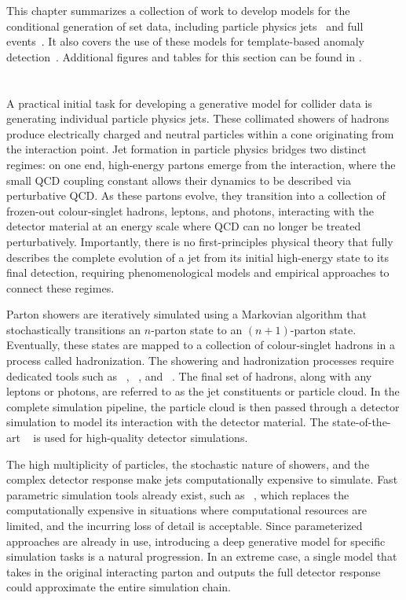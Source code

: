 This chapter summarizes a collection of work to develop models for the conditional generation of set data, including particle physics jets~\cite{PCJedi, EpicJedi, PCDroid} and full events~\cite{PIPPIN}.
It also covers the use of these models for template-based anomaly detection~\cite{Drapes, RadOT}.
Additional figures and tables for this section can be found in .

\section{\pcjedi}

A practical initial task for developing a generative model for collider data is generating individual particle physics jets.
These collimated showers of hadrons produce electrically charged and neutral particles within a cone originating from the interaction point.
Jet formation in particle physics bridges two distinct regimes: on one end, high-energy partons emerge from the interaction, where the small QCD coupling constant allows their dynamics to be described via perturbative QCD.
As these partons evolve, they transition into a collection of frozen-out colour-singlet hadrons, leptons, and photons, interacting with the detector material at an energy scale where QCD can no longer be treated perturbatively.
Importantly, there is no first-principles physical theory that fully describes the complete evolution of a jet from its initial high-energy state to its final detection, requiring phenomenological models and empirical approaches to connect these regimes.

Parton showers are iteratively simulated using a Markovian algorithm that stochastically transitions an $n$-parton state to an $(n+1)$-parton state.
Eventually, these states are mapped to a collection of colour-singlet hadrons in a process called hadronization.
The showering and hadronization processes require dedicated tools such as \pythia~\cite{Pythia8}, \sherpa~\cite{Sherpa}, and \herwig~\cite{Herwig}.
The final set of hadrons, along with any leptons or photons, are referred to as the jet constituents or particle cloud.
In the complete simulation pipeline, the particle cloud is then passed through a detector simulation to model its interaction with the detector material.
The state-of-the-art \geant~\cite{Geant4} is used for high-quality detector simulations.

The high multiplicity of particles, the stochastic nature of showers, and the complex detector response make jets computationally expensive to simulate.
Fast parametric simulation tools already exist, such as \delphes~\cite{Delphes}, which replaces the computationally expensive \geant in situations where computational resources are limited, and the incurring loss of detail is acceptable.
Since parameterized approaches are already in use, introducing a deep generative model for specific simulation tasks is a natural progression.
In an extreme case, a single model that takes in the original interacting parton and outputs the full detector response could approximate the entire simulation chain.

